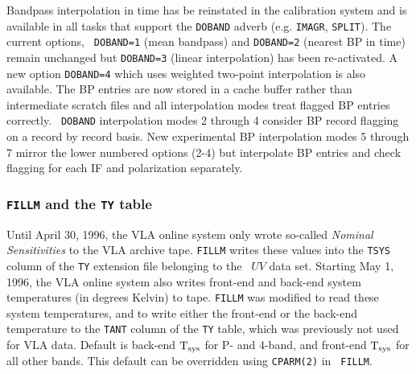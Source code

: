 Bandpass interpolation in time has be reinstated in the calibration
system and is available in all tasks that support the {\tt DOBAND}
adverb (e.g. {\tt IMAGR}, {\tt SPLIT}). The current options, {\tt
DOBAND=1} (mean bandpass) and {\tt DOBAND=2} (nearest BP in time)
remain unchanged but {\tt DOBAND=3} (linear interpolation) has been
re-activated. A new option {\tt DOBAND=4} which uses weighted
two-point interpolation is also available. The BP entries are now
stored in a cache buffer rather than intermediate scratch files and
all interpolation modes treat flagged BP entries correctly. {\tt
DOBAND} interpolation modes 2 through 4 consider BP record flagging on
a record by record basis. New experimental BP interpolation modes 5
through 7 mirror the lower numbered options (2-4) but interpolate BP
entries and check flagging for each IF and polarization separately.

\subsubsection {{\tt FILLM} and the {\tt TY} table}

Until April 30, 1996, the VLA online system only wrote so-called {\it
Nominal Sensitivities} to the VLA archive tape. {\tt FILLM} writes
these values into the {\tt TSYS} column of the {\tt TY} extension file
belonging to the \AIPS\ $UV$ data set. Starting May 1, 1996, the VLA
online system also writes front-end and back-end system temperatures
(in degrees Kelvin) to tape. {\tt FILLM} was modified to read these
system temperatures, and to write either the front-end or the back-end
temperature to the {\tt TANT} column of the {\tt TY} table, which was
previously not used for VLA data. Default is back-end $\rm T_{sys}$
for P- and 4-band, and front-end $\rm T_{sys}$ for all other
bands. This default can be overridden using {\tt CPARM(2)} in {\tt
FILLM}.

%

